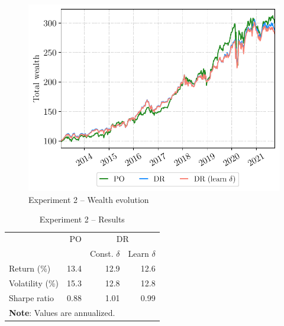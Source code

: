 \documentclass[10pt, twocolumn]{article}
\theoremstyle{plain}
\theoremstyle{definition}
\begin{document}
\begin{figure}[ht]
\begin{center}
\centerline{\includegraphics[width=\columnwidth]{figs/wealth_exp2.pdf}}
\caption{Experiment 2 -- Wealth evolution}
\label{fig:exp2_wealth}
\end{center}
\vskip -0.2in
\end{figure}

\begin{table}[t]
\caption{Experiment 2 -- Results}
\centering
\begin{tabular}{lrrr}
\toprule
				& PO & \multicolumn{2}{c}{DR}\\[0.5ex] \cline{3-4}
\rule{0pt}{3ex}&	 & Const. \(\delta\) & Learn \(\delta\)\\
\midrule
Return (\%)     & 13.4 & 12.9 & 12.6 \\
Volatility (\%) & 15.3 & 12.8 & 12.8 \\
Sharpe ratio    & 0.88 & 1.01 & 0.99 \\
\bottomrule
\multicolumn{4}{p{0.6\linewidth}}{\small\rule{0pt}{3ex}\textbf{Note}: Values are annualized.}\\
\end{tabular}
\label{table:exp2_results}
\end{table}

\end{document}
